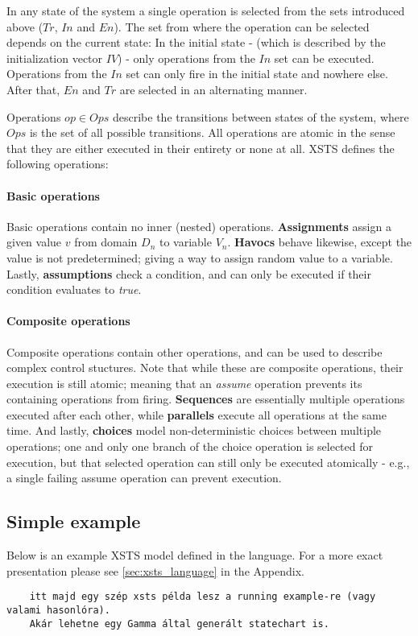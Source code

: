 In any state of the system a single operation is selected from the sets introduced above (\(Tr\), \(In\) and \(En\)). The set from where the operation can be selected depends on the current state: In the initial state - (which is described by the initialization vector \(IV\)) - only operations from the \(In\) set can be executed. Operations from the \(In\) set can only fire in the initial state and nowhere else. After that, \(En\) and \(Tr\) are selected in an alternating manner.

Operations \(op \in Ops\) describe the transitions between states of the system, where \(Ops\) is the set of all possible transitions. All operations are atomic in the sense that they are either executed in their entirety or none at all. XSTS defines the following operations:

\paragraph{Basic operations}

Basic operations contain no inner (nested) operations. \textbf{Assignments} assign a given value \(v\) from domain \(D_n\) to variable \(V_n\). \textbf{Havocs} behave likewise, except the value is not predetermined; giving a way to assign random value to a variable. Lastly, \textbf{assumptions} check a condition, and can only be executed if their condition evaluates to \emph{true}.

\paragraph{Composite operations}

Composite operations contain other operations, and can be used to describe complex control stuctures. Note that while these are composite operations, their execution is still atomic; meaning that an \emph{assume} operation prevents its containing operations from firing. \textbf{Sequences} are essentially multiple operations executed after each other, while \textbf{parallels} execute all operations at the same time. And lastly, \textbf{choices} model non-deterministic choices between multiple operations; one and only one branch of the choice operation is selected for execution, but that selected operation can still only be executed atomically - e.g., a single failing assume operation can prevent execution.

\subsection{Simple example}

Below is an example XSTS model defined in the language. For a more exact presentation please see \autoref{sec:xsts_language} in the Appendix.

\begin{Verbatim}
	itt majd egy szép xsts példa lesz a running example-re (vagy valami hasonlóra). 
	Akár lehetne egy Gamma által generált statechart is.
\end{Verbatim}

